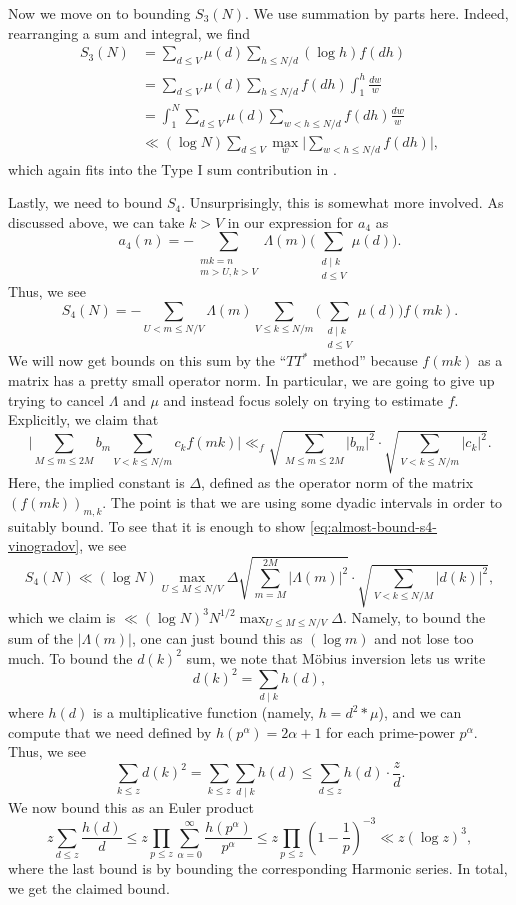 \documentclass[../notes.tex]{subfiles}
\begin{document}
Now we move on to bounding $S_3(N)$. We use summation by parts here. Indeed, rearranging a sum and integral, we find
\begin{align*}
	S_3(N) &= \sum_{d\le V}\mu(d)\sum_{h\le N/d}(\log h)f(dh) \\
	&= \sum_{d\le V}\mu(d)\sum_{h\le N/d}f(dh)\int_1^h\frac{dw}w \\
	&= \int_1^N\sum_{d\le V}\mu(d)\sum_{w<h\le N/d}f(dh)\frac{dw}w \\
	&\ll(\log N)\sum_{d\le V}\max_w\Bigg|\sum_{w<h\le N/d}f(dh)\Bigg|,
\end{align*}
which again fits into the Type I sum contribution in .

Lastly, we need to bound $S_4$. Unsurprisingly, this is somewhat more involved. As discussed above, we can take $k>V$ in our expression for $a_4$ as
\[a_4(n)=-\sum_{\substack{mk=n\\m>U,k>V}}\Lambda(m)\Bigg(\sum_{\substack{d\mid k\\d\le V}}\mu(d)\Bigg).\]
Thus, we see
\[S_4(N)=-\sum_{U<m\le N/V}\Lambda(m)\sum_{V\le k\le N/m}\Bigg(\sum_{\substack{d\mid k\\d\le V}}\mu(d)\Bigg)f(mk).\]
We will now get bounds on this sum by the ``$TT^*$ method'' because $f(mk)$ as a matrix has a pretty small operator norm. In particular, we are going to give up trying to cancel $\Lambda$ and $\mu$ and instead focus solely on trying to estimate $f$. Explicitly, we claim that
\begin{equation}
	\Bigg|\sum_{M\le m\le2M}b_m\sum_{V<k\le N/m}c_kf(mk)\Bigg|\ll_f\sqrt{\sum_{M\le m\le2M}|b_m|^2}\cdot\sqrt{\sum_{V<k\le N/m}|c_k|^2}. \label{eq:almost-bound-s4-vinogradov}
\end{equation}
Here, the implied constant is $\Delta$, defined as the operator norm of the matrix $(f(mk))_{m,k}$. The point is that we are using some dyadic intervals in order to suitably bound. To see that it is enough to show \eqref{eq:almost-bound-s4-vinogradov}, we see
\[S_4(N)\ll(\log N)\max_{U\le M\le N/V}\Delta\sqrt{\sum_{m=M}^{2M}|\Lambda(m)|^2}\cdot\sqrt{\sum_{V<k\le N/M}|d(k)|^2},\]
which we claim is $\ll(\log N)^3N^{1/2}\max_{U\le M\le N/V}\Delta$. Namely, to bound the sum of the $|\Lambda(m)|$, one can just bound this as $(\log m)$ and not lose too much. To bound the $d(k)^2$ sum, we note that M\"obius inversion lets us write
\[d(k)^2=\sum_{d\mid k}h(d),\]
where $h(d)$ is a multiplicative function (namely, $h=d^2*\mu$), and we can compute that we need defined by $h\left(p^\alpha\right)=2\alpha+1$ for each prime-power $p^\alpha$. Thus, we see
\[\sum_{k\le z}d(k)^2=\sum_{k\le z}\sum_{d\mid k}h(d)\le\sum_{d\le z}h(d)\cdot\frac zd.\]
We now bound this as an Euler product
\[z\sum_{d\le z}\frac{h(d)}d\le z\prod_{p\le z}\sum_{\alpha=0}^\infty\frac{h\left(p^\alpha\right)}{p^\alpha}\le z\prod_{p\le z}\left(1-\frac1p\right)^{-3}\ll z(\log z)^3,\]
where the last bound is by bounding the corresponding Harmonic series. In total, we get the claimed bound.
\end{document}

